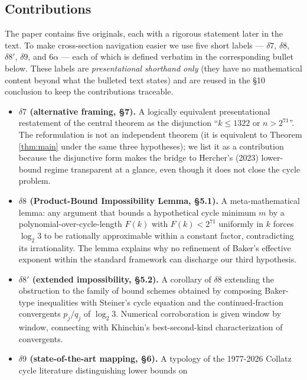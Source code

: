 \documentclass[
  11pt]{amsart}
\theoremstyle{plain}
\theoremstyle{definition}
\theoremstyle{remark}
\begin{document}
\subsection{Contributions}\label{contributions}

The paper contains five originals, each with a rigorous statement later
in the text. To make cross-section navigation easier we use five short
labels --- \(\delta 7\), \(\delta 8\), \(\delta 8'\), \(\delta 9\), and
\(6\alpha\) --- each of which is defined verbatim in the corresponding
bullet below. These labels are \emph{presentational shorthand only}
(they have no mathematical content beyond what the bulleted text states)
and are reused in the §10 conclusion to keep the contributions
traceable.

\begin{itemize}
\item
  \textbf{\(\delta 7\) (alternative framing, §7).} A logically
  equivalent presentational restatement of the central theorem as the
  disjunction ``\(k \leq 1322\) or \(n > 2^{71}\)''. The reformulation
  is not an independent theorem (it is equivalent to Theorem
  \ref{thm:main} under the same three hypotheses); we list it as a
  contribution because the disjunctive form makes the bridge to
  Hercher's (2023) lower-bound regime transparent at a glance, even
  though it does not close the cycle problem.
\item
  \textbf{\(\delta 8\) (Product-Bound Impossibility Lemma, §5.1).} A
  meta-mathematical lemma: any argument that bounds a hypothetical cycle
  minimum \(m\) by a polynomial-over-cycle-length \(F(k)\) with
  \(F(k) < 2^{71}\) uniformly in \(k\) forces \(\log_2 3\) to be
  rationally approximable within a constant factor, contradicting its
  irrationality. The lemma explains why no refinement of Baker's
  effective exponent within the standard framework can discharge our
  third hypothesis.
\item
  \textbf{\(\delta 8'\) (extended impossibility, §5.2).} A corollary of
  \(\delta 8\) extending the obstruction to the family of bound schemes
  obtained by composing Baker-type inequalities with Steiner's cycle
  equation and the continued-fraction convergents \(p_j / q_j\) of
  \(\log_2 3\). Numerical corroboration is given window by window,
  connecting with Khinchin's best-second-kind characterization of
  convergents.
\item
  \textbf{\(\delta 9\) (state-of-the-art mapping, §6).} A typology of
  the 1977-2026 Collatz cycle literature distinguishing lower bounds on

\end{itemize}
\end{document}
